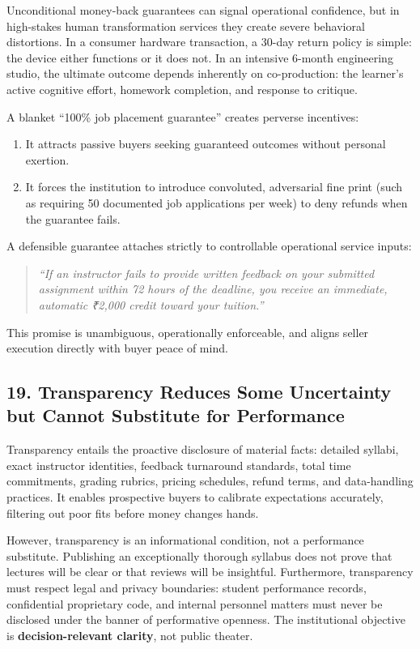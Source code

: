 Unconditional money-back guarantees can signal operational confidence, but in high-stakes human transformation services they create severe behavioral distortions. In a consumer hardware transaction, a 30-day return policy is simple: the device either functions or it does not. In an intensive 6-month engineering studio, the ultimate outcome depends inherently on co-production: the learner's active cognitive effort, homework completion, and response to critique.

A blanket ``100\% job placement guarantee'' creates perverse incentives:
\begin{enumerate}
\item It attracts passive buyers seeking guaranteed outcomes without personal exertion.
\item It forces the institution to introduce convoluted, adversarial fine print (such as requiring 50 documented job applications per week) to deny refunds when the guarantee fails.
\end{enumerate}

A defensible guarantee attaches strictly to controllable operational service inputs:
\begin{quote}
\textit{``If an instructor fails to provide written feedback on your submitted assignment within 72 hours of the deadline, you receive an immediate, automatic ₹2,000 credit toward your tuition.''}
\end{quote}
This promise is unambiguous, operationally enforceable, and aligns seller execution directly with buyer peace of mind.

\subsection*{19. Transparency Reduces Some Uncertainty but Cannot Substitute for Performance}

Transparency entails the proactive disclosure of material facts: detailed syllabi, exact instructor identities, feedback turnaround standards, total time commitments, grading rubrics, pricing schedules, refund terms, and data-handling practices. It enables prospective buyers to calibrate expectations accurately, filtering out poor fits before money changes hands.

However, transparency is an informational condition, not a performance substitute. Publishing an exceptionally thorough syllabus does not prove that lectures will be clear or that reviews will be insightful. Furthermore, transparency must respect legal and privacy boundaries: student performance records, confidential proprietary code, and internal personnel matters must never be disclosed under the banner of performative openness. The institutional objective is \textbf{decision-relevant clarity}, not public theater.

